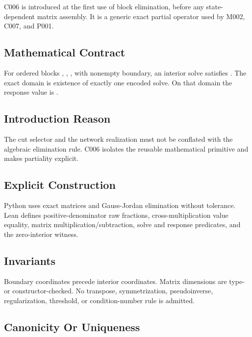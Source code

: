 C006 is introduced at the first use of block elimination, before any
state-dependent matrix assembly. It is a generic exact partial operator
used by M002, C007, and P001.

\subsection{Mathematical Contract}\label{mathematical-contract-7}

For ordered blocks \texttt{\protect{}}, \texttt{\protect{}}, \texttt{\protect{}},
\texttt{\protect{}} with nonempty boundary, an interior solve \texttt{\protect{}}
satisfies \texttt{\protect{}}. The exact domain is existence of
exactly one encoded solve. On that domain the response value is
\texttt{\protect{}}.

\subsection{Introduction Reason}\label{introduction-reason-16}

The cut selector and the network realization must not be conflated with
the algebraic elimination rule. C006 isolates the reusable mathematical
primitive and makes partiality explicit.

\subsection{Explicit Construction}\label{explicit-construction-7}

Python uses exact \texttt{\protect{}} matrices and Gauss-Jordan
elimination without tolerance. Lean defines positive-denominator raw
fractions, cross-multiplication value equality, matrix
multiplication/subtraction, solve and response predicates, and the
zero-interior witness.

\subsection{Invariants}\label{invariants-7}

Boundary coordinates precede interior coordinates. Matrix dimensions are
type- or constructor-checked. No transpose, symmetrization,
pseudoinverse, regularization, threshold, or condition-number rule is
admitted.

\subsection{Canonicity Or Uniqueness}\label{canonicity-or-uniqueness-7}

